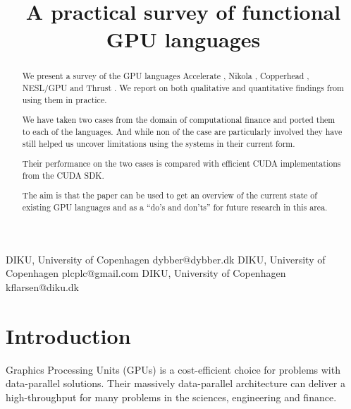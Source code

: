 \documentclass[preprint]{sigplanconf}
\begin{document}
\copyrightdata{[to be supplied]} 


\title{A practical survey of functional GPU languages}

           {DIKU, University of Copenhagen}
           {dybber@dybber.dk}
           {DIKU, University of Copenhagen}
           {plcplc@gmail.com}
           {DIKU, University of Copenhagen}
           {kflarsen@diku.dk}

\maketitle

\begin{abstract}
  We present a survey of the GPU languages Accelerate
  \cite{chakravarty2011accelerating}, Nikola
  \cite{mainland2010nikola}, Copperhead \cite{Catanzaro2011}, NESL/GPU
  \cite{bergstrom2012nested} and Thrust \cite{Thrust}. We report on
  both qualitative and quantitative findings from using them in
  practice.

  We have taken two cases from the domain of computational finance and
  ported them to each of the languages. And while non of the case are
  particularly involved they have still helped us uncover limitations
  using the systems in their current form.

  Their performance on the two cases is compared with efficient CUDA
  implementations from the CUDA SDK.

  The aim is that the paper can be used to get an overview of the
  current state of existing GPU languages and as a ``do's and don'ts''
  for future research in this area.
\end{abstract}




\section{Introduction}
Graphics Processing Units (GPUs) is a cost-efficient choice for
problems with data-parallel solutions. Their massively data-parallel
architecture can deliver a high-throughput for many problems in the
sciences, engineering and finance.
\end{document}
